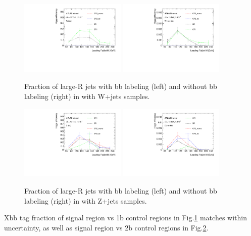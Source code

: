 \begin{figure}[h]
    \centering
    \includegraphics[width=0.45\textwidth]{appendices/fig/eff_W}
    \includegraphics[width=0.45\textwidth]{appendices/fig/eff_Wnon}
    \caption{Fraction of large-R jets with bb labeling (left) and without bb labeling (right) in with W+jets samples.}
    \label{fig:xbbw}
\end{figure}
\begin{figure}[h]
    \centering
    \includegraphics[width=0.45\textwidth]{appendices/fig/eff_Z}
    \includegraphics[width=0.45\textwidth]{appendices/fig/eff_Znon}
    \caption{Fraction of large-R jets with bb labeling (left) and without bb labeling (right) in with Z+jets samples.}
    \label{fig:xbbz}
\end{figure}
\par Xbb tag fraction of signal region vs 1b control regions in Fig.\ref{fig:xbbw} matches within uncertainty, as well as signal region vs 2b control regions in Fig.\ref{fig:xbbz}.
